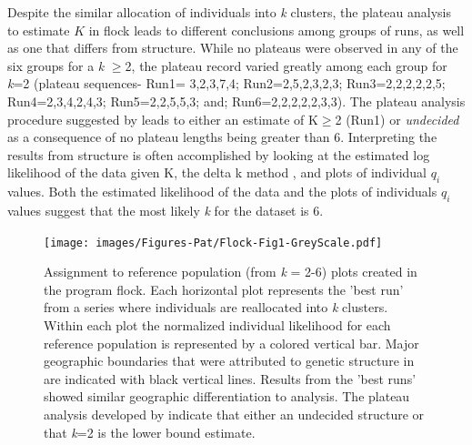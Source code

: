 Despite the similar allocation of individuals into \textit{k} clusters, the 
plateau analysis to estimate $K$ in {\sc flock} leads to different conclusions among groups of runs, as well as 
one that differs from {\sc structure}. While no plateaus were observed in any of the six groups 
for a \textit{k} $\geq$2, the plateau record varied greatly among each
 group for \textit{k}=2 (plateau  sequences- Run1= 3,2,3,7,4; Run2=2,5,2,3,2,3; Run3=2,2,2,2,2,5; 
Run4=2,3,4,2,4,3; Run5=2,2,5,5,3; and; Run6=2,2,2,2,2,3,3). The plateau analysis 
procedure suggested by \citet{Duc&Tur2012} leads to 
either an estimate of K$\geq$2 (Run1) or \textit{undecided} as a consequence of no plateau 
lengths being greater than 6. Interpreting the results from {\sc structure} is often accomplished by 
looking at the estimated log likelihood of the data given K, the delta k method \citep{Evannoetal2005}, and plots of 
individual \textit{$q_i$} values. Both the estimated likelihood of the data
and the plots of individuals \textit{$q_i$} values suggest that 
the most likely \textit{k} for the dataset is 6. 

\begin{figure}
\begin{center}
    \texttt{[image: images/Figures-Pat/Flock-Fig1-GreyScale.pdf]} %
    \caption{Assignment to reference population (from \textit{k} = 2-6) plots created 
in the program {\sc flock}. Each horizontal plot represents the 'best run' from a 
series where individuals are reallocated into \textit{k} clusters. Within each plot 
the normalized individual likelihood for each reference population is represented by a 
colored vertical bar. Major geographic boundaries that were attributed to genetic 
structure in \citet{Garzaetal_norcal} are indicated with black vertical lines. Results 
from the 'best runs' showed similar geographic differentiation to 
\citet{Garzaetal_norcal} analysis. The plateau analysis developed by 
\citet{Duc&Tur2012} indicate that either an undecided structure or that \textit{k}=2 
is the lower bound estimate.}
    \label{Fig.1}
\end{center}
\end{figure}

